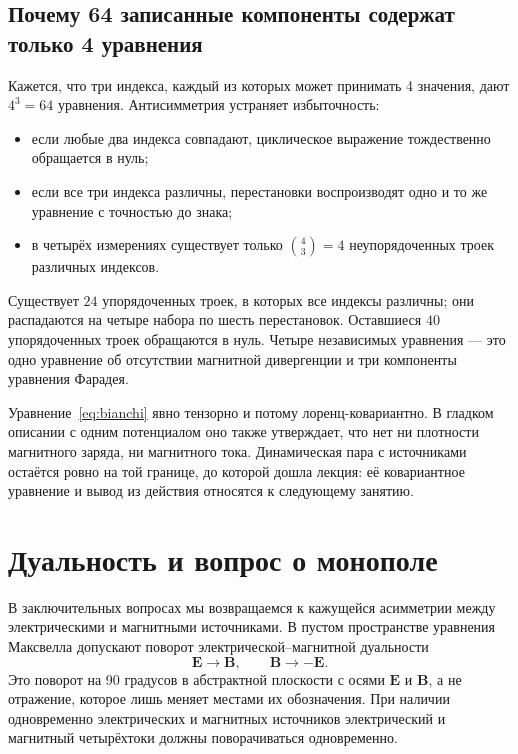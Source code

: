 \subsection{Почему 64 записанные компоненты содержат только 4 уравнения}

Кажется, что три индекса, каждый из которых может принимать
4 значения, дают
\(4^3=64\) уравнения. Антисимметрия устраняет избыточность:
\begin{itemize}
\item если любые два индекса совпадают, циклическое выражение тождественно
обращается в нуль;
\item если все три индекса различны, перестановки воспроизводят одно и то же
уравнение с точностью до знака;
\item в четырёх измерениях существует только
\(\binom{4}{3}=4\) неупорядоченных троек различных индексов.
\end{itemize}
Существует \(24\) упорядоченных троек, в которых все индексы различны; они распадаются на
четыре набора по шесть перестановок. Оставшиеся \(40\) упорядоченных троек
обращаются в нуль. Четыре независимых уравнения — это одно уравнение об отсутствии магнитной
дивергенции и три компоненты уравнения Фарадея.

\begin{classroomqa}
\end{classroomqa}

Уравнение~\eqref{eq:bianchi} явно тензорно и потому
лоренц-ковариантно. В гладком описании с одним потенциалом оно также утверждает,
что нет ни плотности магнитного заряда, ни магнитного тока. Динамическая
пара с источниками остаётся ровно на той границе, до которой дошла
лекция: её ковариантное уравнение и вывод из действия относятся к следующему
занятию.

\section{Дуальность и вопрос о монополе}

В заключительных вопросах мы возвращаемся к кажущейся асимметрии между электрическими и
магнитными источниками. В пустом пространстве уравнения Максвелла допускают
поворот электрической--магнитной дуальности
\begin{equation}
\mathbf E\longrightarrow\mathbf B,
\qquad
\mathbf B\longrightarrow-\mathbf E.
\label{eq:duality-quarter-turn}
\end{equation}
Это поворот на 90 градусов в абстрактной плоскости с осями
\(\mathbf E\) и \(\mathbf B\), а не отражение, которое лишь меняет местами
их обозначения. При наличии одновременно электрических и магнитных источников
электрический и магнитный четырёхтоки должны поворачиваться одновременно.

